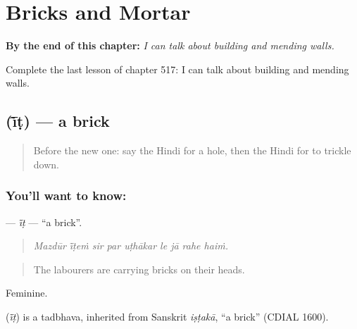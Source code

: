 
\chapter{Bricks and Mortar}
\label{ch:hi-bricks-and-mortar}

\begin{chapteropening}
\textbf{By the end of this chapter:} \emph{I can talk about building and mending walls.}

Complete the last lesson of chapter 517: I can talk about building and mending walls.
\end{chapteropening}

\section[\texorpdfstring{\hi{ईंट} (ī̃ṭ)}{ईंट (ī̃ṭ)}]{ (ī̃ṭ) — a brick}

\label{lesson:HI-C517-it}



\begin{quote}
Before the new one: say the Hindi for a hole, then the Hindi for to trickle down.
\end{quote}

\subsection*{You'll want to know: }
\textbf{} — \emph{ī̃ṭ} — \textquotedblleft{}a brick\textquotedblright{}.

\begin{quote}
        
\end{quote}

\begin{quote}
\emph{Mazdūr ī̃ṭeṁ sir par uṭhākar le jā rahe haiṁ.}
\end{quote}

\begin{quote}
The labourers are carrying bricks on their heads.
\end{quote}

Feminine.

\begin{cousinweb}
\textbf{} (\emph{ī̃ṭ}) is a tadbhava, inherited from Sanskrit \emph{iṣṭakā}, \textquotedblleft{}a brick\textquotedblright{} (CDIAL 1600).
\end{cousinweb}

